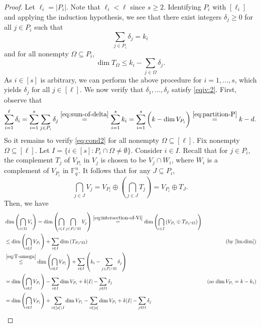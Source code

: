 \documentclass[11pt]{article}
\theoremstyle{plain}
\theoremstyle{definition}
\theoremstyle{remark}
\newcommand{\F}{\mathbb{F}}
\begin{document}
\begin{proof}
Let $\ell_i=|P_i|$. Note that $\ell_i<\ell$ since $s\geq 2$.
Identifying $P_i$ with $[\ell_i]$ and applying the induction hypothesis, we see that there exist integers $\delta_j\geq 0$ for all $j\in P_i$ such that
\begin{equation}\label{eq:sum-of-delta}
\sum_{j\in P_i}\delta_j=k_i
\end{equation}
and for all nonempty $\Omega\subseteq P_i$,
\begin{equation}\label{eq:T-omega}
\dim T_{\Omega}\leq k_i-\sum_{j\in \Omega} \delta_j.
\end{equation}
As $i\in [s]$ is arbitrary, we can perform the above procedure for $i=1,\dots,s$, which yields $\delta_j$ for all $j\in [\ell]$.
We now verify that $\delta_1,\dots,\delta_{\ell}$ satisfy \cref{eqiv:2}. First, observe that
\[
\sum_{i=1}^\ell \delta_i
=\sum_{i=1}^s\sum_{j\in P_i}\delta_j
\stackrel{\eqref{eq:sum-of-delta}}{=}\sum_{i=1}^s k_i
=\sum_{i=1}^s \bigg(k-\dim V_{P_i}\bigg)\stackrel{\eqref{eq:partition-P}}{=}k-d.
\]
So it remains to verify \eqref{eq:cond2} for all nonempty $\Omega\subseteq [\ell]$. 
Fix nonempty $\Omega\subseteq [\ell]$. Let $I=\{i\in [s]: P_i\cap \Omega \neq \emptyset\}$.
Consider $i\in I$. Recall that for $j\in P_i$, the complement $T_j$ of $V_{P_i}$ in $V_j$ is chosen to be $V_j\cap W_i$, where $W_i$ is a complement of $V_{P_i}$ in $\F_q^n$. It follows that for any $J\subseteq P_i$,
\begin{equation}\label{eq:intersection-of-Vi}
\bigcap_{j\in J} V_j=V_{P_i}\oplus \left(\bigcap_{j\in J} T_j\right)=V_{P_i}\oplus T_{J}.
\end{equation}
Then, we have
\begin{align*}
&\dim\left(\bigcap_{i\in \Omega}V_i\right)
=\dim\left(\bigcap_{i\in I}\bigcap_{j\in P_i\cap \Omega} V_j\right)
\stackrel{\eqref{eq:intersection-of-Vi}}{=}\dim\left(\bigcap_{i\in I}\left(V_{P_i}\oplus T_{P_i\cap\Omega}\right)\right)\\
&\leq\dim\left(\bigcap_{i\in I}V_{P_i}\right)+\sum_{i\in I}\dim\left(T_{P_i\cap\Omega}\right) & \text{(by \cref{lm:dim})}\\
&\stackrel{\eqref{eq:T-omega}}{\leq} \dim\left(\bigcap_{i\in I}V_{P_i}\right)+\sum_{i\in I}\left(k_i-\sum_{j\in P_i\cap\Omega} \delta_j\right)\\
&=\dim\left(\bigcap_{i\in I}V_{P_i}\right)-\sum_{i\in I} \dim V_{P_i}+k|I|-\sum_{j\in \Omega}\delta_j & \text{(as  $\dim V_{P_i}=k-k_i$)}\\
&=\dim\left(\bigcap_{i\in I}V_{P_i}\right)+\sum_{i\in [s]\setminus I}\dim V_{P_i}-\sum_{i\in [s]}\dim V_{P_i}+k|I|-\sum_{j\in \Omega}\delta_j\\

\end{align*}
\end{proof}
\end{document}

